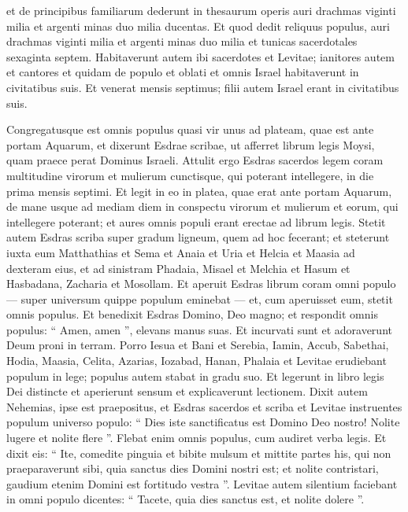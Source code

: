 \begin{biblechapter}
\begin{biblechapter}
\begin{biblechapter}
\begin{biblechapter}
\begin{biblechapter}
\begin{biblechapter}
\begin{biblechapter}
\verse et de principibus familiarum dederunt in thesaurum operis auri drachmas viginti milia et argenti minas duo milia ducentas. 
\verse Et quod dedit reliquus populus, auri drachmas viginti milia et argenti minas duo milia et tunicas sacerdotales sexaginta septem. Habitaverunt autem ibi sacerdotes et Levitae; ianitores autem et cantores et quidam de populo et oblati et omnis Israel habitaverunt in civitatibus suis.
 Et venerat mensis septimus; filii autem Israel erant in civitatibus suis.
 
\begin{biblechapter}
\verse Congregatusque est omnis populus quasi vir unus ad plateam, quae est ante portam Aquarum, et dixerunt Esdrae scribae, ut afferret librum legis Moysi, quam praece perat Dominus Israeli. 
\verse Attulit ergo Esdras sacerdos legem coram multitudine virorum et mulierum cunctisque, qui poterant intellegere, in die prima mensis septimi. 
\verse Et legit in eo in platea, quae erat ante portam Aquarum, de mane usque ad mediam diem in conspectu virorum et mulierum et eorum, qui intellegere poterant; et aures omnis populi erant erectae ad librum legis.
 \verse Stetit autem Esdras scriba super gradum ligneum, quem ad hoc fecerant; et steterunt iuxta eum Matthathias et Sema et Anaia et Uria et Helcia et Maasia ad dexteram eius, et ad sinistram Phadaia, Misael et Melchia et Hasum et Hasbadana, Zacharia et Mosollam. 
\verse Et aperuit Esdras librum coram omni populo — super universum quippe populum eminebat — et, cum aperuisset eum, stetit omnis populus. 
\verse Et benedixit Esdras Domino, Deo magno; et respondit omnis populus: “ Amen, amen ”, elevans manus suas. Et incurvati sunt et adoraverunt Deum proni in terram.
 \verse Porro Iesua et Bani et Serebia, Iamin, Accub, Sabethai, Hodia, Maasia, Celita, Azarias, Iozabad, Hanan, Phalaia et Levitae erudiebant populum in lege; populus autem stabat in gradu suo. 
\verse Et legerunt in libro legis Dei distincte et aperierunt sensum et explicaverunt lectionem. 
\verse Dixit autem Nehemias, ipse est praepositus, et Esdras sacerdos et scriba et Levitae instruentes populum universo populo: “ Dies iste sanctificatus est Domino Deo nostro! Nolite lugere et nolite flere ”. Flebat enim omnis populus, cum audiret verba legis. 
\verse Et dixit eis: “ Ite, comedite pinguia et bibite mulsum et mittite partes his, qui non praeparaverunt sibi, quia sanctus dies Domini nostri est; et nolite contristari, gaudium etenim Domini est fortitudo vestra ”. 
\verse Levitae autem silentium faciebant in omni populo dicentes: “ Tacete, quia dies sanctus est, et nolite dolere ”. 

\end{biblechapter}
\end{biblechapter}
\end{biblechapter}
\end{biblechapter}
\end{biblechapter}
\end{biblechapter}
\end{biblechapter}
\end{biblechapter}
